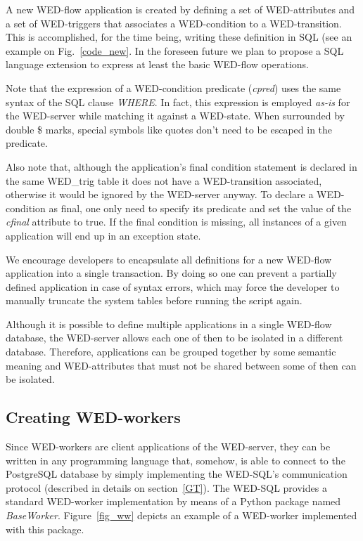 \documentclass[12pt]{article}
\begin{document}
A new WED-flow application is created by defining a set of WED-attributes and a set of WED-triggers that associates a 
WED-condition to a WED-transition. This is accomplished, for the time being, writing these definition in SQL (see an example
on Fig.~\ref{code_new}. In the foreseen future we plan to propose a SQL language extension to express at least the basic WED-flow operations. 

\par Note that the expression of a WED-condition predicate (\emph{cpred}) uses the same syntax of the SQL clause \emph{WHERE}.
In fact, this expression is employed \emph{as-is} for the WED-server while matching it against a WED-state. When surrounded
by double \$ marks, special symbols like quotes don't need to be escaped in the predicate.

\par  Also note that, although the application's final condition statement is declared in the same WED\_trig table it does not
have a WED-transition associated, otherwise it would be ignored by the WED-server anyway. To declare a WED-condition as
final, one only need to specify its predicate and set the value of the \emph{cfinal} attribute to true. If the final condition
is missing, all instances of a given application will end up in an exception state. 

\par We encourage developers to encapsulate all definitions for a new WED-flow application into a single transaction. By doing
so one can prevent a partially defined application in case of syntax errors, which may force the developer to manually truncate
the system tables before running the script again. 

\par Although it is possible to define multiple applications in a single WED-flow database, the WED-server allows each one of
then to be isolated in a different database. Therefore, applications can be grouped together by some semantic meaning and WED-attributes
that must not be shared between some of then can be isolated. 

\subsection{Creating WED-workers}

Since WED-workers are client applications of the WED-server, they can be written in any programming language that, somehow,
is able to connect to the PostgreSQL database by simply implementing the WED-SQL's communication protocol (described in
details on section~\ref{GT}). The WED-SQL provides a standard WED-worker implementation by means of a Python package named
\emph{BaseWorker}. Figure~\ref{fig_ww} depicts an example of a WED-worker implemented with this package.
\end{document}

